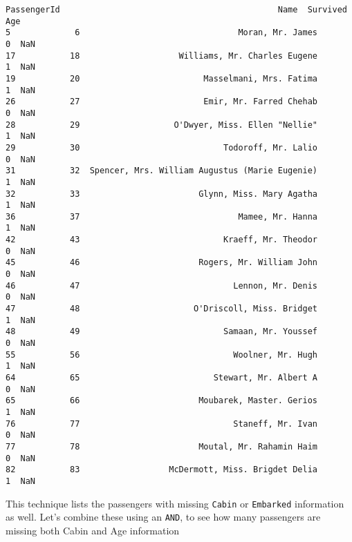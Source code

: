 \documentclass[11pt]{article}
\makeatletter
\newcommand{\boxspacing}{\kern\kvtcb@left@rule\kern\kvtcb@boxsep}
\newcommand{\prompt}[4]{
        {\ttfamily\llap{{\color{#2}[#3]:\hspace{3pt}#4}}\vspace{-\baselineskip}}
    }
\makeatother
\begin{document}
            \begin{tcolorbox}[breakable, size=fbox, boxrule=.5pt, pad at break*=1mm, opacityfill=0]
\prompt{Out}{outcolor}{19}{\boxspacing}
\begin{Verbatim}[commandchars=\\\{\}]
    PassengerId                                            Name  Survived  Age
5             6                                Moran, Mr. James         0  NaN
17           18                    Williams, Mr. Charles Eugene         1  NaN
19           20                         Masselmani, Mrs. Fatima         1  NaN
26           27                         Emir, Mr. Farred Chehab         0  NaN
28           29                   O'Dwyer, Miss. Ellen "Nellie"         1  NaN
29           30                             Todoroff, Mr. Lalio         0  NaN
31           32  Spencer, Mrs. William Augustus (Marie Eugenie)         1  NaN
32           33                        Glynn, Miss. Mary Agatha         1  NaN
36           37                                Mamee, Mr. Hanna         1  NaN
42           43                             Kraeff, Mr. Theodor         0  NaN
45           46                        Rogers, Mr. William John         0  NaN
46           47                               Lennon, Mr. Denis         0  NaN
47           48                       O'Driscoll, Miss. Bridget         1  NaN
48           49                             Samaan, Mr. Youssef         0  NaN
55           56                               Woolner, Mr. Hugh         1  NaN
64           65                           Stewart, Mr. Albert A         0  NaN
65           66                        Moubarek, Master. Gerios         1  NaN
76           77                               Staneff, Mr. Ivan         0  NaN
77           78                        Moutal, Mr. Rahamin Haim         0  NaN
82           83                  McDermott, Miss. Brigdet Delia         1  NaN
\end{Verbatim}
\end{tcolorbox}
        
    This technique lists the passengers with missing \texttt{Cabin} or
\texttt{Embarked} information as well. Let's combine these using an
\texttt{AND}, to see how many passengers are missing both Cabin and Age
information
\end{document}
